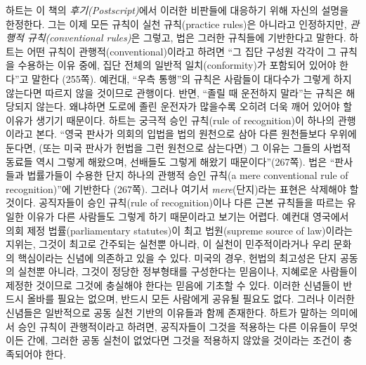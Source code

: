 \documentclass[12pt, oneside]{book}  %
\begin{document}
하트는 이 책의 \emph{후기(Postscript)}에서 이러한 비판들에 대응하기 위해
자신의 설명을 한정한다. 그는 이제 모든 규칙이 실천 규칙(practice
rules)은 아니라고 인정하지만, \emph{관행적 규칙(conventional rules)}은
그렇고, 법은 그러한 규칙들에 기반한다고 말한다. 하트는 어떤 규칙이
관행적(conventional)이라고 하려면 ``그 집단 구성원 각각이 그 규칙을
수용하는 이유 중에, 집단 전체의 일반적 일치(conformity)가 포함되어
있어야 한다''고 말한다 (255쪽). 예컨대, ``우측 통행''의 규칙은 사람들이
대다수가 그렇게 하지 않는다면 따르지 않을 것이므로 관행이다. 반면,
``졸릴 때 운전하지 말라''는 규칙은 해당되지 않는다. 왜냐하면 도로에 졸린
운전자가 많을수록 오히려 더욱 깨어 있어야 할 이유가 생기기 때문이다.
하트는 궁극적 승인 규칙(rule of recognition)이 하나의 관행이라고 본다.
``영국 판사가 의회의 입법을 법의 원천으로 삼아 다른 원천들보다 우위에
둔다면, (또는 미국 판사가 헌법을 그런 원천으로 삼는다면) 그 이유는
그들의 사법적 동료들 역시 그렇게 해왔으며, 선배들도 그렇게 해왔기
때문이다''(267쪽). 법은 ``판사들과 법률가들이 수용한 단지 하나의 관행적
승인 규칙(a mere conventional rule of recognition)''에 기반한다 (267쪽).
그러나 여기서 \emph{mere}(단지)라는 표현은 삭제해야 할 것이다.
공직자들이 승인 규칙(rule of recognition)이나 다른 근본 규칙들을 따르는
유일한 이유가 다른 사람들도 그렇게 하기 때문이라고 보기는 어렵다. 예컨대
영국에서 의회 제정 법률(parliamentary statutes)이 최고 법원(supreme
source of law)이라는 지위는, 그것이 최고로 간주되는 실천뿐 아니라, 이
실천이 민주적이라거나 우리 문화의 핵심이라는 신념에 의존하고 있을 수
있다. 미국의 경우, 헌법의 최고성은 단지 공동의 실천뿐 아니라, 그것이
정당한 정부형태를 구성한다는 믿음이나, 지혜로운 사람들이 제정한 것이므로
그것에 충실해야 한다는 믿음에 기초할 수 있다. 이러한 신념들이 반드시
올바를 필요는 없으며, 반드시 모든 사람에게 공유될 필요도 없다. 그러나
이러한 신념들은 일반적으로 공동 실천 기반의 이유들과 함께 존재한다.
하트가 말하는 의미에서 승인 규칙이 관행적이라고 하려면, 공직자들이
그것을 적용하는 다른 이유들이 무엇이든 간에, 그러한 공동 실천이 없었다면
그것을 적용하지 않았을 것이라는 조건이 충족되어야 한다.
\end{document}
